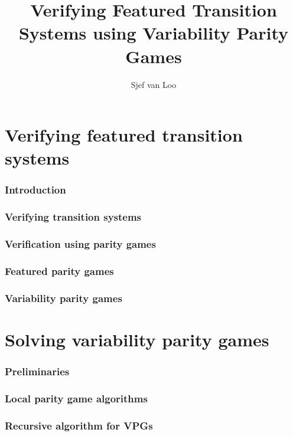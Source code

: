 \documentclass[]{article}
\title{Verifying Featured Transition Systems using Variability Parity Games}
\author{Sjef van Loo}
\begin{document}
\maketitle

\tableofcontents

\part{Verifying featured transition systems}
\label{part:verifying}
\section{Introduction}


\section{Verifying transition systems}


\section{Verification using parity games}


\section{Featured parity games}


\section{Variability parity games}

\pagebreak
\part{Solving variability parity games}


\section{Preliminaries}


\section{Local parity game algorithms}


\section{Recursive algorithm for VPGs}

\end{document}
